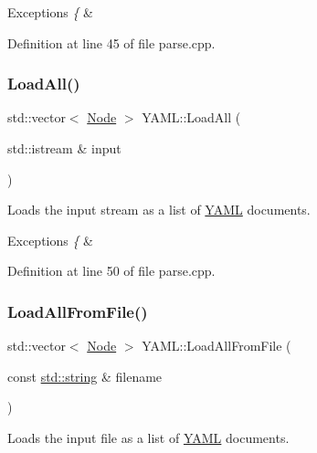 \begin{DoxyExceptions}{Exceptions}
{\em \{} & \\
\hline
\end{DoxyExceptions}


Definition at line 45 of file parse.\+cpp.

\mbox{\label{namespace_y_a_m_l_a8fedb8703f6e4a864821f1970455e51b}} 
\subsubsection{\texorpdfstring{LoadAll()}{LoadAll()}\hspace{0.1cm}{\footnotesize\ttfamily [3/3]}}
{\footnotesize\ttfamily std\+::vector$<$ \mbox{\hyperlink{class_y_a_m_l_1_1_node}{Node}} $>$ Y\+A\+M\+L\+::\+Load\+All (\begin{DoxyParamCaption}\item[{std\+::istream \&}]{input }\end{DoxyParamCaption})}

Loads the input stream as a list of \mbox{\hyperlink{namespace_y_a_m_l}{Y\+A\+ML}} documents.


\begin{DoxyExceptions}{Exceptions}
{\em \{} & \\
\hline
\end{DoxyExceptions}


Definition at line 50 of file parse.\+cpp.

\mbox{\label{namespace_y_a_m_l_a47a9d2cd6e7dd7aa60e1dabdf1b71a1a}} 
\subsubsection{\texorpdfstring{LoadAllFromFile()}{LoadAllFromFile()}}
{\footnotesize\ttfamily std\+::vector$<$ \mbox{\hyperlink{class_y_a_m_l_1_1_node}{Node}} $>$ Y\+A\+M\+L\+::\+Load\+All\+From\+File (\begin{DoxyParamCaption}\item[{const \mbox{\hyperlink{glad_8h_ac83513893df92266f79a515488701770}{std\+::string}} \&}]{filename }\end{DoxyParamCaption})}

Loads the input file as a list of \mbox{\hyperlink{namespace_y_a_m_l}{Y\+A\+ML}} documents.


